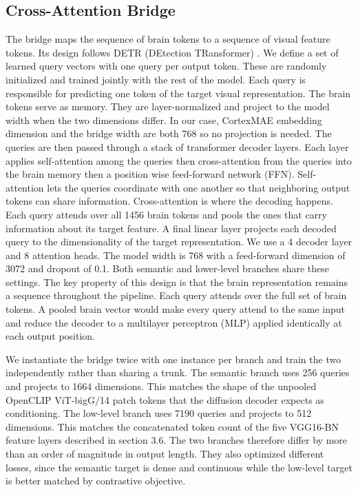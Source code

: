 \subsection{Cross-Attention Bridge}
The bridge maps the sequence of brain tokens to a sequence of visual feature tokens. Its design follows DETR (DEtection TRansformer) \cite{DBLP:journals/corr/abs-2005-12872}. We define a set of learned query vectors with one query per output token. These are randomly initialized and trained jointly with the rest of the model. Each query is responsible for predicting one token of the target visual representation.
The brain tokens serve as memory. They are layer-normalized and project to the model width when the two dimensions differ. In our case, CortexMAE embedding dimension and the bridge width are both 768 so no projection is needed. The queries are then passed through a stack of transformer decoder layers. Each layer applies self-attention among the queries then cross-attention from the queries into the brain memory then a position wise feed-forward network (FFN). Self-attention lets the queries coordinate with one another so that neighboring output tokens can share information. Cross-attention is where the decoding happens. Each query attends over all 1456 brain tokens and pools the ones that carry information about its target feature. A final linear layer projects each decoded query to the dimensionality of the target representation.
We use a 4 decoder layer and 8 attention heads. The model width is 768 with a feed-forward dimension of 3072 and dropout of 0.1. Both semantic and lower-level branches share these settings.
The key property of this design is that the brain representation remains a sequence throughout the pipeline. Each query attends over the full set of brain tokens. A pooled brain vector would make every query attend to the same input and reduce the decoder to a multilayer perceptron (MLP) applied identically at each output position.

We instantiate the bridge twice with one instance per branch and train the two independently rather than sharing a trunk. The semantic branch uses 256 queries and projects to 1664 dimensions. This matches the shape of the unpooled OpenCLIP ViT-bigG/14 \cite{radford2021learningtransferablevisualmodels, ilharco_gabriel_2021_5143773, schuhmann2022laionb} patch tokens that the diffusion decoder expects as conditioning. The low-level branch uses 7190 queries and projects to 512 dimensions. This matches the concatenated token count of the five VGG16-BN feature layers described in section 3.6. The two branches therefore differ by more than an order of magnitude in output length. They also optimized different losses, since the semantic target is dense and continuous while the low-level target is better matched by contrastive objective.

